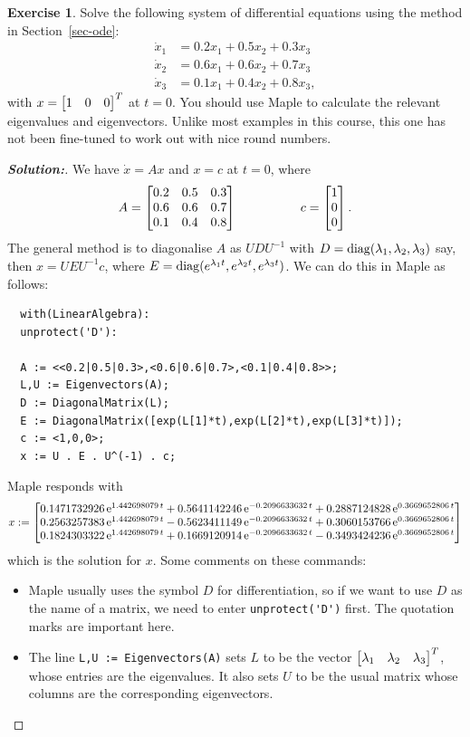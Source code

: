 \documentclass[a4paper]{amsart}
\theoremstyle{definition}
\newtheorem{exercise}{Exercise}
\newenvironment{solution}{\begin{proof}[\textbf{Solution:}] \vphantom{u}}{\end{proof}}
\begin{document}
\begin{exercise}\label{ex-ode-i}
 Solve the following system of differential equations using the method
 in Section~\ref{sec-ode}:
 \begin{align*}
  \dot{x}_1 &= 0.2 x_1 + 0.5 x_2 + 0.3 x_3 \\
  \dot{x}_2 &= 0.6 x_1 + 0.6 x_2 + 0.7 x_3 \\
  \dot{x}_3 &= 0.1 x_1 + 0.4 x_2 + 0.8 x_3,
 \end{align*}
 with $x=\left[\begin{matrix} 1 & 0 & 0 \end{matrix}\right]^T$ at $t=0$.  You should use Maple to
 calculate the relevant eigenvalues and eigenvectors.  Unlike most
 examples in this course, this one has not been fine-tuned to work out
 with nice round numbers.
\end{exercise}
\begin{solution}
 We have $\dot{x}=Ax$ and $x=c$ at $t=0$, where 
 \[ A = \left[\begin{matrix} 0.2 & 0.5 & 0.3 \\
             0.6 & 0.6 & 0.7 \\
             0.1 & 0.4 & 0.8 \end{matrix}\right] 
    \hspace{5em}
    c = \left[\begin{matrix} 1 \\ 0 \\ 0 \end{matrix}\right].
 \]
 The general method is to diagonalise $A$ as $UDU^{-1}$ with
 $D=\operatorname{diag}(\lambda_1,\lambda_2,\lambda_3)$ say, then $x=UEU^{-1}c$, where
 $E=\operatorname{diag}(e^{\lambda_1 t},e^{\lambda_2 t},e^{\lambda_3 t})$.  We can do this in
 Maple as follows:
 \begin{verbatim}
  with(LinearAlgebra):
  unprotect('D'):

  A := <<0.2|0.5|0.3>,<0.6|0.6|0.7>,<0.1|0.4|0.8>>;
  L,U := Eigenvectors(A);
  D := DiagonalMatrix(L);
  E := DiagonalMatrix([exp(L[1]*t),exp(L[2]*t),exp(L[3]*t)]);
  c := <1,0,0>;
  x := U . E . U^(-1) . c;
 \end{verbatim}
 Maple responds with 
 \[ x := 
     \left[\begin{matrix} 
      0.1471732926\,{{\rm e}^{ 1.442698079\,t}}+
      0.5641142246\,{{\rm e}^{-0.2096633632\,t}}+ 
      0.2887124828\,{{\rm e}^{ 0.3669652806\,t}} \\ 
      0.2563257383\,{{\rm e}^{ 1.442698079\,t}}
    - 0.5623411149\,{{\rm e}^{-0.2096633632\,t}} +
      0.3060153766\,{{\rm e}^{ 0.3669652806\,t}}\\
      0.1824303322\,{{\rm e}^{ 1.442698079\,t}}+
      0.1669120914\,{{\rm e}^{-0.2096633632\,t}}
    - 0.3493424236\,{{\rm e}^{ 0.3669652806\,t}}
     \end{matrix}\right]
 \]
 which is the solution for $x$.  Some comments on these commands:
 \begin{itemize}
  \item Maple usually uses the symbol $D$ for differentiation, so if
   we want to use $D$ as the name of a matrix, we need to enter
   \verb+unprotect('D')+ first.  The quotation marks are important
   here.
  \item The line \verb+L,U := Eigenvectors(A)+ sets $L$ to be the
   vector $\left[\begin{matrix} \lambda_1 & \lambda_2 & \lambda_3\end{matrix}\right]^T$, whose entries are the
   eigenvalues.  It also sets $U$ to be the usual matrix whose columns
   are the corresponding eigenvectors.
 \end{itemize}
\end{solution}
\end{document}
